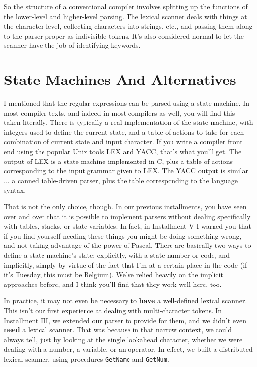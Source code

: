 So the structure of a conventional compiler involves splitting up the functions of  the  lower-level and higher-level parsing. The lexical  scanner  deals  with  things  at  the  character  level, collecting characters into strings, etc., and passing  them along to the parser proper as indivisible tokens. It's also considered normal to let the scanner have the job of identifying keywords.

\section{State Machines And Alternatives}

I  mentioned  that  the regular expressions can be parsed using a state machine. In  most  compiler  texts, and  indeed  in most compilers as well, you will find this taken literally. There is typically  a  real  implementation  of  the  state  machine, with integers used to define the current state, and a table of actions to  take   for  each  combination  of  current  state  and  input character. If you  write  a compiler front end using the popular Unix tools LEX and YACC, that's  what  you'll get. The output of LEX is a state machine implemented in C, plus a table  of actions corresponding to the input grammar given to LEX. The YACC output is  similar  ... a canned table-driven parser, plus  the  table corresponding to the language syntax.

That  is  not  the  only  choice, though. In   our  previous installments, you have seen over and over that it is  possible to implement  parsers  without  dealing  specifically  with  tables, stacks, or state variables. In fact, in Installment V I warned you that if you  find  yourself needing these things you might be doing something wrong, and not taking advantage of  the  power of Pascal. There are basically two ways to define a state machine's state: explicitly, with  a  state number or code, and implicitly, simply by virtue of the fact that I'm at a  certain  place in the code  (if  it's  Tuesday, this  must be Belgium). We've  relied heavily on the implicit approaches  before, and  I  think you'll find that they work well here, too.

In practice, it may not even be necessary to {\bfseries have}  a well-defined lexical scanner. This isn't our first experience at dealing with multi-character tokens. In  Installment  III, we  extended our parser to provide  for  them, and  we didn't even {\bfseries need} a lexical scanner. That  was  because  in that narrow context, we  could always tell, just  by  looking at the single lookahead character, whether  we  were  dealing  with  a  number, a variable, or  an operator. In effect, we  built  a  distributed  lexical scanner, using procedures {\tt GetName} and {\tt GetNum}.

